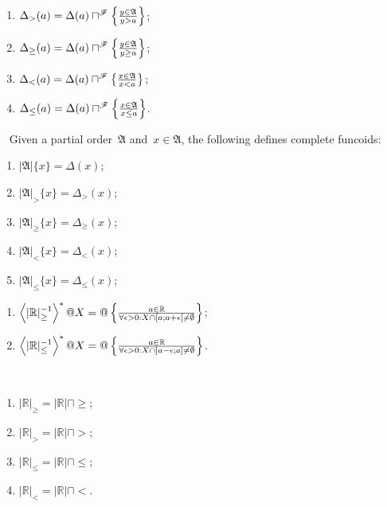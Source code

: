 \begin{obvious}
~
\begin{enumerate}
\item $\Delta_{>}(a) = \Delta(a)\sqcap^{\mathscr{F}} \left\{ \frac{y\in\mathfrak{A}}{y>a}\right\}$;
\item $\Delta_{\geq}(a) = \Delta(a)\sqcap^{\mathscr{F}} \left\{ \frac{y\in\mathfrak{A}}{y\geq a}\right\}$;
\item $\Delta_{<}(a) = \Delta(a)\sqcap^{\mathscr{F}} \left\{ \frac{x\in\mathfrak{A}}{x<a}\right\}$;
\item $\Delta_{\leq}(a) = \Delta(a)\sqcap^{\mathscr{F}} \left\{ \frac{x\in\mathfrak{A}}{x\leq a}\right\}$.
\end{enumerate}
\end{obvious}

\begin{defn}
~
Given a partial order~$\mathfrak{A}$ and~$x\in\mathfrak{A}$, the following defines complete funcoids:
\begin{enumerate}
\item $|\mathfrak{A}|\{x\} = \Delta(x)$;
\item $|\mathfrak{A}|_{>}\{x\} = \Delta_{>}(x)$;
\item $|\mathfrak{A}|_{\geq}\{x\} = \Delta_{\geq}(x)$;
\item $|\mathfrak{A}|_{<}\{x\} = \Delta_{<}(x)$;
\item $|\mathfrak{A}|_{\leq}\{x\} = \Delta_{\leq}(x)$;
\end{enumerate}
\end{defn}

\begin{xca}
\begin{enumerate}
\item $\left\langle |\mathbb{R}|_{\geq}^{-1}\right\rangle ^{\ast}@X = @\left\{ \frac{a\in\mathbb{R}}{\forall\epsilon>0:X\cap[a;a+\epsilon[\ne\emptyset}\right\}$;
\item $\left\langle |\mathbb{R}|_{\leq}^{-1}\right\rangle ^{\ast}@X = @\left\{ \frac{a\in\mathbb{R}}{\forall\epsilon>0:X\cap]a-\epsilon;a]\ne\emptyset}\right\}$.
\end{enumerate}
\end{xca}

\begin{conjecture}
~
\begin{enumerate}
\item $|\mathbb{R}|_{\geq} = |\mathbb{R}| \sqcap \geq$;
\item $|\mathbb{R}|_{>} = |\mathbb{R}| \sqcap >$;
\item $|\mathbb{R}|_{\leq} = |\mathbb{R}| \sqcap \leq$;
\item $|\mathbb{R}|_{<} = |\mathbb{R}| \sqcap <$.
\end{enumerate}
\end{conjecture}

